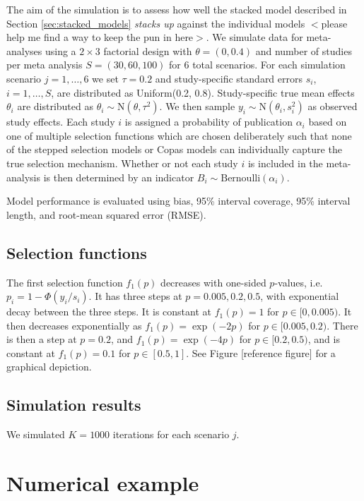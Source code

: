\documentclass[12pt]{article}   	%
\numberwithin{equation}{section}
\begin{document}
The aim of the simulation is to assess how well the stacked model described in Section \ref{sec:stacked_models} \textit{stacks up} against the individual models $<$please help me find a way to keep the pun in here$>$. We simulate data for meta-analyses using a $2\times3$ factorial design with $\theta = (0, 0.4)$ and number of studies per meta analysis $S = (30, 60, 100)$ for 6 total scenarios. For each simulation scenario $j = 1, \dots, 6$ we set $\tau = 0.2$ and study-specific standard errors $s_i$, $i = 1, \dots, S$, are distributed as Uniform(0.2, 0.8). Study-specific true mean effects $\theta_i$ are distributed as $\theta_i \sim \text{N}(\theta, \tau^2)$. We then sample $y_i \sim \text{N}(\theta_i, s_i^2)$ as observed study effects. Each study $i$ is assigned a probability of publication $\alpha_i$ based on one of multiple selection functions which are chosen deliberately such that none of the stepped selection models or Copas models can individually capture the true selection mechanism. Whether or not each study $i$ is included in the meta-analysis is then determined by an indicator $B_i \sim \text{Bernoulli}(\alpha_i)$. 

Model performance is evaluated using bias, 95\% interval coverage, 95\% interval length, and root-mean squared error (RMSE). 

\subsection{Selection functions}

The first selection function $f_1(p)$ decreases with one-sided $p$-values, i.e. $p_i = 1 - \Phi(y_i / s_i)$. It has three steps at $p = 0.005, 0.2, 0.5$, with exponential decay between the three steps. It is constant at $f_1(p) = 1$ for $p \in [0, 0.005)$. It then decreases exponentially as $f_1(p) = \exp(-2p)$ for $p \in [0.005, 0.2)$. There is then a step at $p=0.2$, and $f_1(p) = \exp(-4p)$ for $p \in [0.2, 0.5)$, and is constant at $f_1(p) = 0.1$ for $p \in [0.5, 1]$. See Figure [reference figure] for a graphical depiction.

\subsection{Simulation results}

We simulated $K=1000$ iterations for each scenario $j$.

\section{Numerical example} \label{sec:numex}
\end{document}
